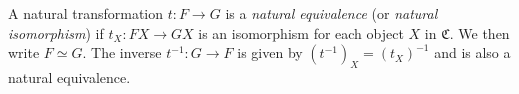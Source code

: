 A natural transformation $t : F \to G$ is a \textit{natural equivalence} (or \textit{natural isomorphism}) if $t_X : FX \to GX$ is an isomorphism for each object $X$ in $\mathfrak{C}$. We then write $F \simeq G$. The inverse $t^{-1} : G \to F$ is given by $(t^{-1})_X = (t_X)^{-1}$ and is also a natural equivalence.
